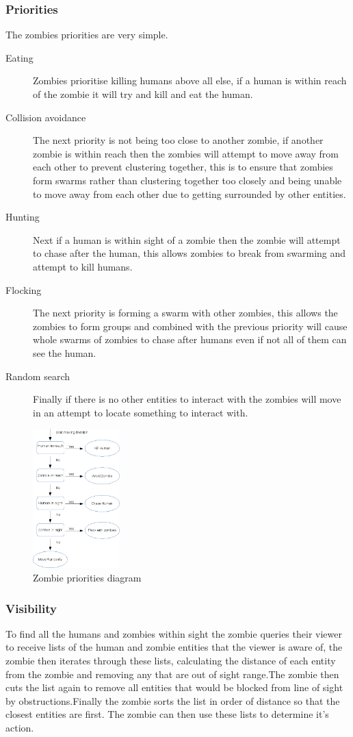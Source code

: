 \subsubsection{Priorities}
The zombies priorities are very simple.	\begin{description}\item[Eating]{Zombies prioritise killing humans above all else, if a human is within reach of the zombie it will try and kill and eat the human.}\item[Collision avoidance]{The next priority is not being too close to another zombie, if another zombie is within reach then the zombies will attempt to move away from each other to prevent clustering together, this is to ensure that zombies form swarms rather than clustering together too closely and being unable to move away from each other due to getting surrounded by other entities.}\item[Hunting]{Next if a human is within sight of a zombie then the zombie will attempt to chase after the human, this allows zombies to break from swarming and attempt to kill humans.}\item[Flocking]{The next priority is forming a swarm with other zombies, this allows the zombies to form groups and combined with the previous priority will cause whole swarms of zombies to chase after humans even if not all of them can see the human.}\item[Random search]{Finally if there is no other entities to interact with the zombies will move in an attempt to locate something to interact with.} \end{description}
\begin{figure}[h]
  \centering
  \includegraphics[width=0.3\textwidth]{img/zombie_decision_tree.png}
\caption{Zombie priorities diagram}
    \label{fig:Zombie priorities diagram}
\end{figure}
\subsubsection{Visibility}
To find all the humans and zombies within sight the zombie queries their viewer to receive lists of the human and zombie entities that the viewer is aware of, the zombie then iterates through these lists, calculating the distance of each entity from the zombie and removing any that are out of sight range.The zombie then cuts the list again to remove all entities that would be blocked from line of sight by obstructions.Finally the zombie sorts the list in order of distance so that the closest entities are first.
The zombie can then use these lists to determine it's action.
